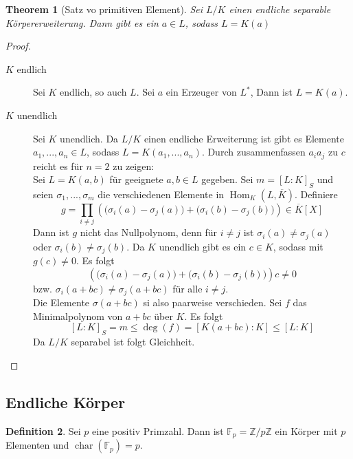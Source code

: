 \documentclass[10pt,a4paper]{article}
\newcommand{\Z}{\ensuremath{\mathbb{Z}}}
\newcommand{\F}{\ensuremath{\mathbb{F}}}
\newcommand{\ol}[1]{\overline{#1}}
\newcommand{\cha}{\operatorname{char}}
\newcommand{\Hom}{\operatorname{Hom}}
\theoremstyle{plain}
\newtheorem{theorem}{Theorem}[section]
\theoremstyle{definition}
\newtheorem{definition}[theorem]{Definition}
\theoremstyle{remark}
\begin{document}
	\begin{theorem}[Satz vo primitiven Element]\label{satz:primElem}
		Sei $L/K$ einen endliche separable Körpererweiterung. Dann gibt es ein $a\in L$, sodass $L=K(a)$
	\end{theorem}
	\begin{proof}
		\begin{description}
			\item[$K$ endlich] Sei $K$ endlich, so auch $L$. Sei $a$ ein Erzeuger von $L^*$, Dann ist $L=K(a)$.
			\item[$K$ unendlich] Sei $K$ unendlich. Da $L/K$ einen endliche Erweiterung ist gibt es Elemente $a_1,...,a_n\in L$, sodass $L=K(a_1,...,a_n)$. Durch zusammenfassen $a_ia_j$ zu $c$ reicht es für $n=2$ zu zeigen:\\
			Sei $L=K(a,b)$ für geeignete $a,b\in L$ gegeben. Sei $m=[L:K]_S$ und seien $\sigma_1,...,\sigma_m$ die verschiedenen Elemente in $\Hom_K(L,\ol K)$. Definiere
			\[g=\prod_{i\neq j}\left(\big(\sigma_i(a)-\sigma_j(a)\big)+\big(\sigma_i(b)-\sigma_j(b)\big)\right)\in \ol K[X]\]
			Dann ist $g$ nicht das Nullpolynom, denn für $i\neq j$ ist $\sigma_i(a)\neq \sigma_j(a)$ oder $\sigma_i(b)\neq \sigma_j(b)$. Da $K$ unendlich gibt es ein $c\in K$, sodass mit $g(c)\neq 0$. Es folgt
			\[\left(\big(\sigma_i(a)-\sigma_j(a)\big)+\big(\sigma_i(b)-\sigma_j(b)\big)\right)c\neq 0\]
			bzw. $\sigma_{i}(a+bc)\neq \sigma_j(a+bc)$ für alle $i\neq j$.\\
			Die Elemente $\sigma(a+bc)$ si also paarweise verschieden. Sei $f$  das Minimalpolynom von $a+bc$ über $K$. Es folgt
			\[[L:K]_S=m\leq \deg(f)=[K(a+bc):K]\leq [L:K]\]
			Da $L/K$ separabel ist folgt Gleichheit.
		\end{description}
	
	\end{proof}




	\subsection{Endliche Körper}
	\begin{definition}
		Sei $p$ eine positiv Primzahl. Dann ist $\F_p=\Z/p\Z$ ein Körper mit $p$ Elementen und $\cha(\F_p)=p$.
	\end{definition}
\end{document}
